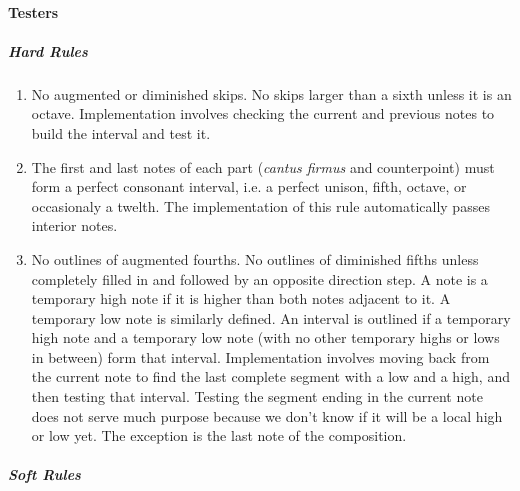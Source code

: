 \paragraph{Testers}
\subparagraph{Hard Rules}
	\begin{enumerate}
		\item No augmented or diminished skips. No skips larger than a sixth unless it is an octave.
					Implementation involves checking the current and previous notes to build the interval and test it.

		\item The first and last notes of each part (\emph{cantus firmus} and counterpoint) must form a perfect consonant interval, i.e. a perfect unison, fifth, octave, or occasionaly a twelth.
          The implementation of this rule automatically passes interior notes.

		\item No outlines of augmented fourths. No outlines of diminished fifths unless completely filled in and followed by an opposite direction step.
          A note is a temporary high note if it is higher than both notes adjacent to it. A temporary low note is similarly defined.
          An interval is outlined if a temporary high note and a temporary low note (with no other temporary highs or lows in between) form that interval.
					Implementation involves moving back from the current note to find the last complete segment with a low and a high, and then testing that interval.
					Testing the segment ending in the current note does not serve much purpose because we don't know if it will be a local high or low yet. The exception is the last note of the composition.

	\end{enumerate}
\subparagraph{Soft Rules}
